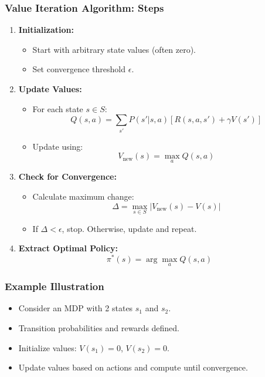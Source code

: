 \documentclass{beamer}
\begin{document}
\begin{frame}[fragile]
    \frametitle{Value Iteration Algorithm: Steps}
    \begin{enumerate}
        \item \textbf{Initialization:}
            \begin{itemize}
                \item Start with arbitrary state values (often zero).
                \item Set convergence threshold $\epsilon$.
            \end{itemize}
        \item \textbf{Update Values:}
            \begin{itemize}
                \item For each state $s \in S$: 
                \begin{equation}
                Q(s, a) = \sum_{s'} P(s'|s, a) \left[ R(s, a, s') + \gamma V(s') \right]
                \end{equation}
                \item Update using:
                \begin{equation}
                V_{\text{new}}(s) = \max_{a} Q(s, a)
                \end{equation}
            \end{itemize}
        \item \textbf{Check for Convergence:}
            \begin{itemize}
                \item Calculate maximum change:
                \begin{equation}
                \Delta = \max_{s \in S} |V_{\text{new}}(s) - V(s)|
                \end{equation}
                \item If $\Delta < \epsilon$, stop. Otherwise, update and repeat.
            \end{itemize}
        \item \textbf{Extract Optimal Policy:}
            \begin{equation}
            \pi^*(s) = \arg\max_{a} Q(s, a)
            \end{equation}
    \end{enumerate}
\end{frame}

\begin{frame}[fragile]
    \frametitle{Example Illustration}
    \begin{itemize}
        \item Consider an MDP with 2 states $s_1$ and $s_2$.
        \item Transition probabilities and rewards defined.
        \item Initialize values: $V(s_1) = 0$, $V(s_2) = 0$.
        \item Update values based on actions and compute until convergence.
    \end{itemize}
\end{frame}
\end{document}
